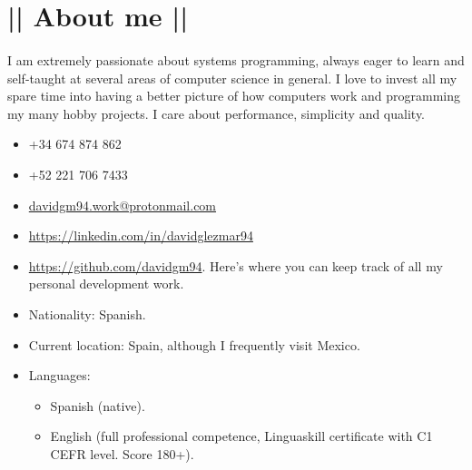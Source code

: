 \section*{|| About me ||}
\paragraph{}I am extremely passionate about systems programming, always eager to learn and self-taught at several areas of computer science in general. I love to invest all my spare time into having a better picture of how computers work and programming my many hobby projects. I care about performance, simplicity and quality.

\begin{itemize}
	\item[] \faPhone \space +34 674 874 862
	\item[] \faPhone \space +52 221 706 7433
	\item[] \faMailReply \space \href{mailto:davidgm94.work@protonmail.com}{davidgm94.work@protonmail.com}
	\item[] \faLinkedin \space \href{https://linkedin.com/in/davidglezmar94}{https://linkedin.com/in/davidglezmar94}
	\item[] \faGithub \space \href{https://github.com/davidgm94}{https://github.com/davidgm94}. Here's where you can keep track of all my personal development work.
	\item[] Nationality: Spanish.
	\item[] Current location: Spain, although I frequently visit Mexico.
	\item[] Languages:
	\begin{itemize}
		\item Spanish (native).
		\item English (full professional competence, Linguaskill certificate with C1 CEFR level. Score 180+).
	\end{itemize}
\end{itemize}
